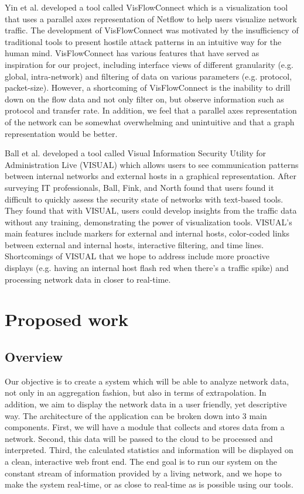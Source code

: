 \documentclass{sig-alternate}
\begin{document}
Yin et al.\cite{Yin04} developed a tool called VisFlowConnect which is a
visualization tool that uses a parallel axes representation of Netflow to help
users visualize network traffic. The development of VisFlowConnect was motivated
by the insufficiency of traditional tools to present hostile attack patterns in
an intuitive way for the human mind.  VisFlowConnect has various features that
have served as inspiration for our project, including interface views of
different granularity (e.g. global, intra-network) and filtering of data on
various parameters (e.g. protocol, packet-size). However, a shortcoming of
VisFlowConnect is the inability to drill down on the flow data and not only
filter on, but observe information such as protocol and transfer rate. In
addition, we feel that a parallel axes representation of the network can be
somewhat overwhelming and unintuitive and that a graph representation would be
better.

Ball et al.\cite{Ball04} developed a tool called Visual Information Security
Utility for Administration Live (VISUAL) which allows users to see communication
patterns between internal networks and external hosts in a graphical
representation.  After surveying IT professionals, Ball, Fink, and North found
that users found it difficult to quickly assess the security state of networks
with text-based tools. They found that with VISUAL, users could develop insights
from the traffic data without any training, demonstrating the power of
visualization tools. VISUAL's main features include markers for external and
internal hosts, color-coded links between external and internal hosts,
interactive filtering, and time lines. Shortcomings of VISUAL that we hope to
address include more proactive displays (e.g. having an internal host flash red
when there's a traffic spike) and processing network data in closer to
real-time.

\section{Proposed work}

\subsection{Overview}

Our objective is to create a system which will be able to analyze network data,
not only in an aggregation fashion, but also in terms of extrapolation. In
addition, we aim to display the network data in a user friendly, yet descriptive
way. The architecture of the application can be broken down into 3 main
components. First, we will have a module that collects and stores data from a
network. Second, this data will be passed to the cloud to be processed and
interpreted. Third, the calculated statistics and information will be displayed
on a clean, interactive web front end. The end goal is to run our system on the
constant stream of information provided by a living network, and we hope to make
the system real-time, or as close to real-time as is possible using our tools.
\end{document}
